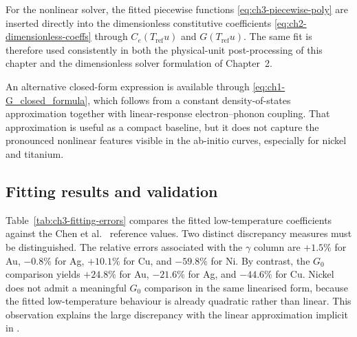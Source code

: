 For the nonlinear solver, the fitted piecewise functions
\eqref{eq:ch3-piecewise-poly} are inserted directly into the
dimensionless constitutive coefficients
\eqref{eq:ch2-dimensionless-coeffs} through
\(C_e(T_{\mathrm{ref}}u)\) and \(G(T_{\mathrm{ref}}u)\). The same fit is
therefore used consistently in both the physical-unit post-processing of
this chapter and the dimensionless solver formulation of Chapter~2.

An alternative closed-form expression is available through
\eqref{eq:ch1-G_closed_formula}, which follows from a constant
density-of-states approximation together with linear-response
electron--phonon coupling. That approximation is useful as a compact
baseline, but it does not capture the pronounced nonlinear features
visible in the ab-initio curves, especially for nickel and titanium.

\subsection{Fitting results and validation}
\label{sec:ch3-fitting-results}

Table~\ref{tab:ch3-fitting-errors} compares the fitted low-temperature
coefficients against the Chen et al.~\cite{Chen_2010} reference values.
Two distinct discrepancy measures must be distinguished. The relative
errors associated with the \(\gamma\) column are
\(+1.5\%\) for Au, \(-0.8\%\) for Ag, \(+10.1\%\) for Cu, and
\(-59.8\%\) for Ni. By contrast, the \(G_0\) comparison yields
\(+24.8\%\) for Au, \(-21.6\%\) for Ag, and \(-44.6\%\) for Cu. Nickel
does not admit a meaningful \(G_0\) comparison in the same linearised
form, because the fitted low-temperature behaviour is already quadratic
rather than linear. This observation explains the large discrepancy with
the linear approximation implicit in \cite{Chen_2010}.

